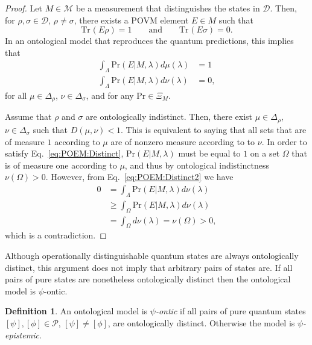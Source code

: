 \documentclass[DIV=calc,paper=a4,fontsize=11pt,twocolumn]{scrartcl} %
\theoremstyle{definition}
\newtheorem{definition}{Definition}[section]
\theoremstyle{plain}
\newcommand{\Proj}[1]{\ensuremath{\left [ #1 \right ]}}
\newcommand{\Tr}[2][]{\ensuremath{\text{Tr}_{#1} \left ( #2 \right )}}
\begin{document}
\begin{proof}
Let $M \in \mathcal{M}$ be a measurement that distinguishes the
states in $\mathcal{D}$.  Then, for $\rho, \sigma \in \mathcal{D}$,
$\rho \neq \sigma$, there exists a POVM element $E \in M$ such that
\begin{equation}
\Tr{E\rho} = 1 \qquad \text{and} \qquad \Tr{E\sigma} = 0.
\end{equation}
In an ontological model that reproduces the quantum predictions,
this implies that
\begin{align}
\int_{\Lambda} \text{Pr}(E|M,\lambda) d\mu(\lambda) & =
1 \label{eq:POEM:Distinct}\\
\int_{\Lambda} \text{Pr}(E|M,\lambda)d\nu(\lambda) & =
0, \label{eq:POEM:Distinct2}
\end{align}
for all $\mu \in \Delta_{\rho}$, $\nu \in \Delta_{\sigma}$, and for
any $\text{Pr} \in \Xi_M$.

Assume that $\rho$ and $\sigma$ are ontologically indistinct.  Then,
there exist $\mu \in \Delta_{\rho}$, $\nu \in \Delta_{\sigma}$ such
that $D(\mu,\nu) < 1$.  This is equivalent to saying that all sets
that are of measure $1$ according to $\mu$ are of nonzero measure
according to to $\nu$.  In order to satisfy
Eq.~\eqref{eq:POEM:Distinct}, $\text{Pr}(E|M,\lambda)$ must be equal
to $1$ on a set $\Omega$ that is of measure one according to $\mu$,
and thus by ontological indistinctness $\nu(\Omega) > 0$.  However,
from Eq.~\eqref{eq:POEM:Distinct2} we have
\begin{align}
0 & = \int_{\Lambda} \text{Pr}(E|M,\lambda) d\nu(\lambda) \\
& \geq \int_{\Omega} \text{Pr}(E|M,\lambda) d\nu(\lambda)\\
& = \int_{\Omega} d\nu(\lambda) = \nu(\Omega) > 0,
\end{align}
which is a contradiction.
\end{proof}

Although operationally distinguishable quantum states are always
ontologically distinct, this argument does not imply that arbitrary
pairs of states are.  If all pairs of pure states are nonetheless
ontologically distinct then the ontological model is $\psi$-ontic.
\begin{definition}
\label{def:POEM:PON}
An ontological model is $\psi$\emph{-ontic} if all pairs of pure
quantum states $\Proj{\psi}, \Proj{\phi} \in \mathcal{P}$,
$\Proj{\psi} \neq \Proj{\phi}$, are ontologically distinct.
Otherwise the model is $\psi$\emph{-epistemic}.
\end{definition}
\end{document}
